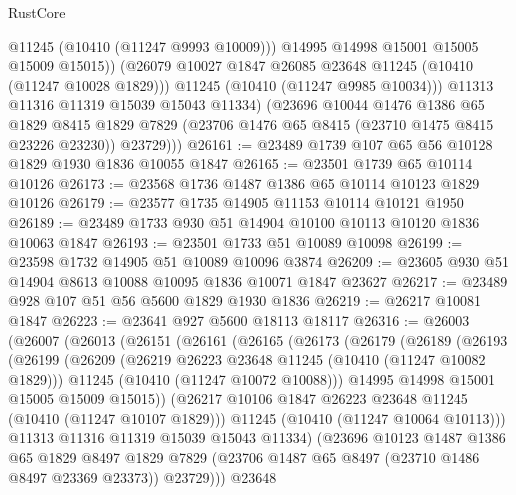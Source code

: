 \begin{lexlean}{RustCore}
\begin{coremodule}
                  @11245
                  (@10410 (@11247 @9993 @10009)))
                @14995
                @14998
                @15001
                @15005
                @15009
                @15015))
            (@26079 @10027 @1847 @26085 @23648 @11245 (@10410 (@11247 @10028 @1829)))
            @11245
            (@10410 (@11247 @9985 @10034)))
          @11313
          @11316
          @11319
          @15039
          @15043
          @11334)
        (@23696
          @10044
          @1476
          @1386
          @65
          @1829
          @8415
          @1829
          @7829
          (@23706 @1476 @65 @8415 (@23710 @1475 @8415 @23226 @23230))
          @23729)))
@26161 := @23489 @1739 @107 @65 @56 @10128 @1829 @1930 @1836 @10055 @1847
@26165 := @23501 @1739 @65 @10114 @10126
@26173 := @23568 @1736 @1487 @1386 @65 @10114 @10123 @1829 @10126
@26179 := @23577 @1735 @14905 @11153 @10114 @10121 @1950
@26189 := @23489 @1733 @930 @51 @14904 @10100 @10113 @10120 @1836 @10063 @1847
@26193 := @23501 @1733 @51 @10089 @10098
@26199 := @23598 @1732 @14905 @51 @10089 @10096 @3874
@26209 := @23605 @930 @51 @14904 @8613 @10088 @10095 @1836 @10071 @1847 @23627
@26217 := @23489 @928 @107 @51 @56 @5600 @1829 @1930 @1836
@26219 := @26217 @10081 @1847
@26223 := @23641 @927 @5600 @18113 @18117
@26316 := @26003
    (@26007
      (@26013
        (@26151
          (@26161
            (@26165
              (@26173
                (@26179
                  (@26189
                    (@26193
                      (@26199
                        (@26209
                          (@26219 @26223 @23648 @11245 (@10410 (@11247 @10082 @1829)))
                          @11245
                          (@10410 (@11247 @10072 @10088)))
                        @14995
                        @14998
                        @15001
                        @15005
                        @15009
                        @15015))
                    (@26217 @10106 @1847 @26223 @23648 @11245 (@10410 (@11247 @10107 @1829)))
                    @11245
                    (@10410 (@11247 @10064 @10113)))
                  @11313
                  @11316
                  @11319
                  @15039
                  @15043
                  @11334)
                (@23696
                  @10123
                  @1487
                  @1386
                  @65
                  @1829
                  @8497
                  @1829
                  @7829
                  (@23706 @1487 @65 @8497 (@23710 @1486 @8497 @23369 @23373))
                  @23729)))
            @23648

\end{coremodule}
\end{lexlean}
